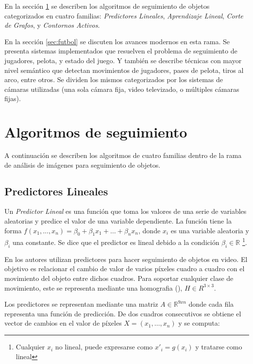 \documentclass[a4paper,10pt]{article}
\begin{document}
En la sección \ref{sec:tracking} se describen los algoritmos de seguimiento
de objetos categorizados en cuatro familias:
\textit{Predictores Lineales},
\textit{Aprendizaje Lineal},
\textit{Corte de Grafos},
y \textit{Contornos Activos}.

En la sección \ref{sec:futbol} se discuten los avances modernos en esta rama.
Se presenta sistemas implementados que resuelven el problema de seguimiento de
jugadores, pelota, y estado del juego. Y también se describe técnicas con
mayor nivel semántico que detectan movimientos de jugadores, pases de pelota,
tiros al arco, entre otros. Se dividen los mismos categorizados por los
sistemas de cámaras utilizadas (una sola cámara fija, video televizado, o
múltiples cámaras fijas).

\newpage

\section{Algoritmos de seguimiento}
\label{sec:tracking}

A continuación se describen los algoritmos de cuatro familias dentro de la rama
de análisis de imágenes para seguimiento de objetos.

\subsection{Predictores Lineales}

Un \textit{Predictor Lineal} es una función que toma los valores de una serie
de variables aleatorias y predice el valor de una variable dependiente.  La
función tiene la forma $f(x_1, ..., x_n) = \beta_0 + \beta_1 x_1 + \dots +
\beta_n x_n$, donde $x_i$ es una variable aleatoria y $\beta_i$ una constante.
Se dice que el predictor es lineal debido a la condición $\beta_i \in \mathbb{R}$
\footnote{Cualquier $x_i$ no lineal, puede expresarse como $x'_i = g(x_i)$ y tratarse como lineal}.

En \cite{alp, original-linear-predictors} los autores utilizan predictores para
hacer seguimiento de objetos en video.  El objetivo es relacionar el cambio de
valor de varios píxeles cuadro a cuadro con el movimiento del objeto entre
dichos cuadros.  Para soportar cualquier clase de movimiento, este se
representa mediante una homografia (\cite{homography-estimation}), $H \in
R^{3\times3}$.

Los predictores se representan mediante una matriz $A \in \mathbb{R}^{9xn}$
donde cada fila representa una función de predicción.  De dos cuadros
consecutivos se obtiene el vector de cambios en el valor de píxeles $X = (x_1,
\dots, x_n)$ y se computa:
\end{document}

